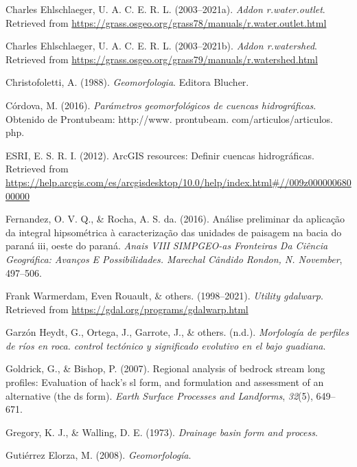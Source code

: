 \documentclass[11pt,]{article}
\begin{document}
\hypertarget{ref-wateroutlet}{}
Charles Ehlschlaeger, U. A. C. E. R. L. (2003--2021a). \emph{Addon
r.water.outlet}. Retrieved from
\url{https://grass.osgeo.org/grass78/manuals/r.water.outlet.html}

\hypertarget{ref-watershedcharles}{}
Charles Ehlschlaeger, U. A. C. E. R. L. (2003--2021b). \emph{Addon
r.watershed}. Retrieved from
\url{https://grass.osgeo.org/grass79/manuals/r.watershed.html}

\hypertarget{ref-christofoletti1988geomorfologia}{}
Christofoletti, A. (1988). \emph{Geomorfologia}. Editora Blucher.

\hypertarget{ref-cordova2016parametros}{}
Córdova, M. (2016). \emph{Parámetros geomorfológicos de cuencas
hidrográficas}. Obtenido de Prontubeam: http://www. prontubeam.
com/articulos/articulos. php.

\hypertarget{ref-ESRI2012}{}
ESRI, E. S. R. I. (2012). ArcGIS resources: Definir cuencas
hidrográficas. Retrieved from
\url{https://help.arcgis.com/es/arcgisdesktop/10.0/help/index.html\#//009z00000068000000}

\hypertarget{ref-fernandez2016analise}{}
Fernandez, O. V. Q., \& Rocha, A. S. da. (2016). Análise preliminar da
aplicação da integral hipsométrica à caracterização das unidades de
paisagem na bacia do paraná iii, oeste do paraná. \emph{Anais VIII
SIMPGEO-as Fronteiras Da Ciência Geográfica: Avanços E Possibilidades.
Marechal Cândido Rondon, N. November}, 497--506.

\hypertarget{ref-gdalwarp}{}
Frank Warmerdam, Even Rouault, \& others. (1998--2021). \emph{Utility
gdalwarp}. Retrieved from \url{https://gdal.org/programs/gdalwarp.html}

\hypertarget{ref-garzonmorfologia}{}
Garzón Heydt, G., Ortega, J., Garrote, J., \& others. (n.d.).
\emph{Morfología de perfiles de ríos en roca. control tectónico y
significado evolutivo en el bajo guadiana}.

\hypertarget{ref-goldrick2007regional}{}
Goldrick, G., \& Bishop, P. (2007). Regional analysis of bedrock stream
long profiles: Evaluation of hack's sl form, and formulation and
assessment of an alternative (the ds form). \emph{Earth Surface
Processes and Landforms}, \emph{32}(5), 649--671.

\hypertarget{ref-gregory1973drainage}{}
Gregory, K. J., \& Walling, D. E. (1973). \emph{Drainage basin form and
process}.

\hypertarget{ref-gutierrez2008geomorfologia}{}
Gutiérrez Elorza, M. (2008). \emph{Geomorfología}.
\end{document}
